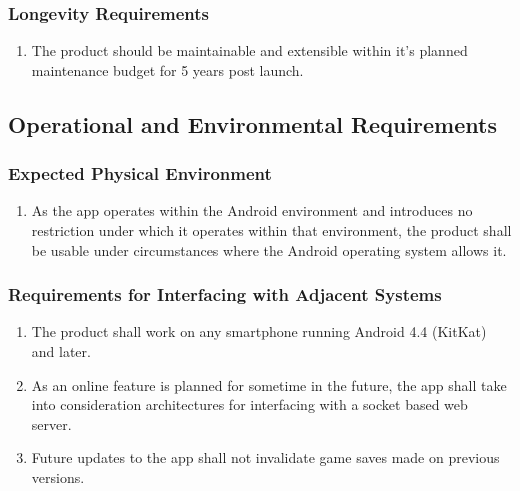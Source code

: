 \documentclass[]{article}
\begin{document}
\subsubsection{Longevity Requirements}
\label{ssub:longevity_requirements}
\begin{enumerate}[{PR}1. ]
	\resumeEnum
	\item The product should be maintainable and extensible within it's planned maintenance budget for 5 years post launch.
\end{enumerate}


\subsection{Operational and Environmental Requirements}
\label{sub:operational_and_environmental_requirements}

\subsubsection{Expected Physical Environment}
\label{ssub:expected_physical_environment}
\begin{enumerate}[{OE}1. ]
	\item As the app operates within the Android environment and introduces no restriction under which it operates within that environment, the product shall be usable under circumstances where the Android operating system allows it.
	\holdEnum
\end{enumerate}

\subsubsection{Requirements for Interfacing with Adjacent Systems}
\label{ssub:requirements_for_interfacing_with_adjacent_systems}
\begin{enumerate}[{OE}1. ]
	\resumeEnum
	\item The product shall work on any smartphone running Android 4.4 (KitKat) and later.
	\item As an online feature is planned for sometime in the future, the app shall take into consideration architectures for interfacing with a socket based web server.
	\item Future updates to the app shall not invalidate game saves made on previous versions.
	\holdEnum
\end{enumerate}
\end{document}
